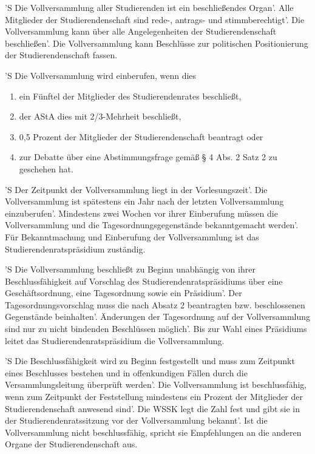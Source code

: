 \documentclass[fontsize=12pt,parskip=half]{scrartcl}
\begin{document}
\begin{contract}

  'S Die Vollversammlung aller Studierenden ist ein beschließendes Organ'. Alle
  Mitglieder der Studierendenschaft sind rede-, antrags- und stimmberechtigt'.
  Die Vollversammlung kann über alle Angelegenheiten der Studierendenschaft
  beschließen'. Die Vollversammlung kann Beschlüsse zur politischen
  Positionierung der Studierendenschaft fassen.

  'S Die Vollversammlung wird einberufen, wenn dies
  \begin{enumerate}[\qquad 1.]
  \item ein Fünftel der Mitglieder des Studierendenrates beschließt,
  \item der AStA dies mit 2/3-Mehrheit beschließt,
  \item 0,5 Prozent der Mitglieder der Studierendenschaft beantragt oder
  \item zur Debatte über eine Abstimmungsfrage gemäß § 4 Abs. 2 Satz 2 zu
    geschehen hat.
  \end{enumerate}
  'S Der Zeitpunkt der Vollversammlung liegt in der Vorlesungszeit'. Die
  Vollversammlung ist spätestens ein Jahr nach der letzten Vollversammlung
  einzuberufen'. Mindestens zwei Wochen vor ihrer Einberufung müssen die
  Vollversammlung und die Tagesordnungsgegenstände bekanntgemacht werden'. Für
  Bekanntmachung und Einberufung der Vollversammlung ist das
  Studierendenratspräsidium zuständig.

  'S Die Vollversammlung beschließt zu Beginn unabhängig von ihrer
  Beschlussfähigkeit auf Vorschlag des Studierendenratspräsidiums über eine
  Geschäftsordnung, eine Tagesordnung sowie ein Präsidium'. Der
  Tagesordnungsvorschlag muss die nach Absatz 2 beantragten bzw. beschlossenen
  Gegenstände beinhalten'. Änderungen der Tagesordnung auf der Vollversammlung
  sind nur zu nicht bindenden Beschlüssen möglich'. Bis zur Wahl eines Präsidiums
  leitet das Studierendenratspräsidium die Vollversammlung.

  'S Die Beschlussfähigkeit wird zu Beginn festgestellt und muss zum Zeitpunkt
  eines Beschlusses bestehen und in offenkundigen Fällen durch die
  Versammlungsleitung überprüft werden'. Die Vollversammlung ist beschlussfähig,
  wenn zum Zeitpunkt der Feststellung mindestens ein Prozent der Mitglieder der
  Studierendenschaft anwesend sind'. Die WSSK legt die Zahl fest und gibt sie in
  der Studierendenratssitzung vor der Vollversammlung bekannt'. Ist die
  Vollversammlung nicht beschlussfähig, spricht sie Empfehlungen an die anderen
  Organe der Studierendenschaft aus.


\end{contract}
\end{document}
